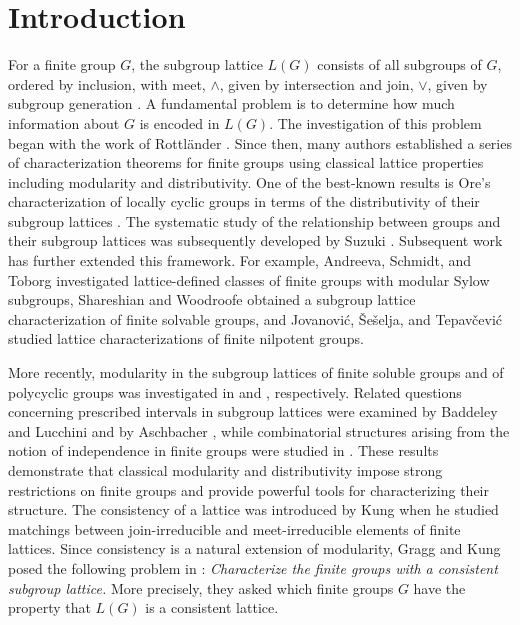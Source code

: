 \documentclass[12pt]{article}
\begin{document}
\section{Introduction}
For a finite group $G$, the subgroup lattice $L(G)$ consists 
of all subgroups of $G$, ordered by inclusion, with meet, $\wedge$, 
given by intersection and join, $\vee$, given by subgroup
generation \cite{Suz, Schmidt}. 
A fundamental problem is to determine how much information about $G$ 
is encoded in $L(G)$. The investigation of this problem began 
with the work of Rottl\"{a}nder \cite{Rott}. Since then, 
many authors established a series of characterization theorems 
for finite groups using classical lattice properties including 
modularity and distributivity. One of the best-known results is 
Ore's characterization of locally cyclic groups in terms of 
the distributivity of their subgroup lattices \cite{Ore}.  
The systematic study of the relationship between groups and 
their subgroup lattices was subsequently developed by 
Suzuki \cite{Suz51,Suz52}. Subsequent work has further 
extended this framework. For example, Andreeva, Schmidt, 
and Toborg \cite{Andreeva} investigated lattice-defined classes of finite 
groups with modular Sylow subgroups, Shareshian and 
Woodroofe \cite{Shareshian} obtained a subgroup lattice characterization 
of finite solvable groups, and Jovanovi\'{c}, \v{S}e\v{s}elja, 
and Tepav\v{c}evi\'{c} \cite{Jovanovi,Jovanovi24} studied lattice 
characterizations of finite nilpotent groups. 

More recently, modularity 
in the subgroup lattices of finite soluble groups and of polycyclic groups was investigated in \cite{Liu} and \cite{Trombetti}, respectively. 
Related questions concerning prescribed intervals in subgroup 
lattices were examined by Baddeley and Lucchini \cite{Baddeley} 
and by Aschbacher \cite{Aschbacher}, while combinatorial structures 
arising from the notion of independence 
in finite groups were studied in \cite{Lucchini}. These results demonstrate that classical modularity and distributivity 
impose strong restrictions on finite groups and provide powerful tools 
for characterizing their structure. The consistency of a lattice was 
introduced by Kung \cite{Kung} when he studied matchings between 
join-irreducible and meet-irreducible elements of finite lattices. 
Since consistency is a natural extension of modularity, Gragg and Kung 
posed the following problem in \cite[Problem 8.2]{Gragg}: 
\textit{Characterize the finite groups with a consistent subgroup lattice.} 
More precisely, they asked which finite groups $G$ have the property 
that $L(G)$ is a consistent lattice. 
\end{document}
